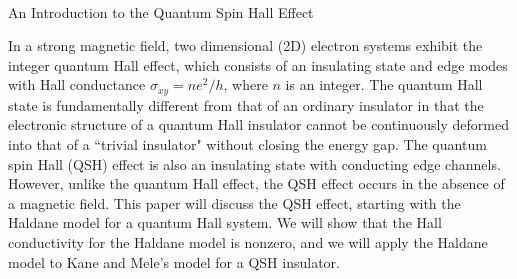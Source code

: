 \documentclass[a4paper,12pt]{article}
\begin{document}

\begin{center}
\mbox{} \\
{ \large An Introduction to the Quantum Spin Hall Effect}
\end{center}

\doublespacing

In a strong magnetic field, two dimensional (2D) electron systems exhibit the integer quantum Hall effect, which consists of an insulating state and edge modes with Hall conductance $\sigma_{xy}=ne^2/h$, where $n$ is an integer.  The quantum Hall state is fundamentally different from that of an ordinary insulator in that the electronic structure of a quantum Hall insulator cannot be continuously deformed into that of a ``trivial insulator" without closing the energy gap.  The quantum spin Hall (QSH) effect is also an insulating state with conducting edge channels.  However, unlike the quantum Hall effect, the QSH effect occurs in the absence of a magnetic field.  This paper will discuss the QSH effect, starting with the Haldane model for a quantum Hall system.  We will show that the Hall conductivity for the Haldane model is nonzero, and we will apply the Haldane model to Kane and Mele's model for a QSH insulator.
\end{document}
